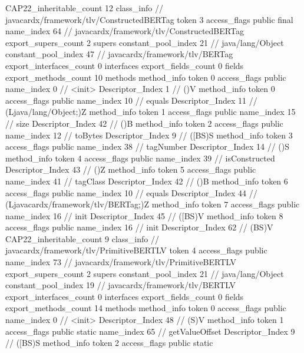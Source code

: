 {{{{{				}
			}
			CAP22_inheritable_count	12
		}
		class_info {		// javacardx/framework/tlv/ConstructedBERTag
			token	3
			access_flags	public final
			name_index	64		// javacardx/framework/tlv/ConstructedBERTag
			export_supers_count	2
			supers {
				constant_pool_index	21		// java/lang/Object
				constant_pool_index	47		// javacardx/framework/tlv/BERTag
			}
			export_interfaces_count	0
			interfaces {
			}
			export_fields_count	0
			fields {
			}
			export_methods_count	10
			methods {
				method_info {
					token	0
					access_flags	public
					name_index	0		// <init>
					Descriptor_Index	1		// ()V
				}
				method_info {
					token	0
					access_flags	public
					name_index	10		// equals
					Descriptor_Index	11		// (Ljava/lang/Object;)Z
				}
				method_info {
					token	1
					access_flags	public
					name_index	15		// size
					Descriptor_Index	42		// ()B
				}
				method_info {
					token	2
					access_flags	public
					name_index	12		// toBytes
					Descriptor_Index	9		// ([BS)S
				}
				method_info {
					token	3
					access_flags	public
					name_index	38		// tagNumber
					Descriptor_Index	14		// ()S
				}
				method_info {
					token	4
					access_flags	public
					name_index	39		// isConstructed
					Descriptor_Index	43		// ()Z
				}
				method_info {
					token	5
					access_flags	public
					name_index	41		// tagClass
					Descriptor_Index	42		// ()B
				}
				method_info {
					token	6
					access_flags	public
					name_index	10		// equals
					Descriptor_Index	44		// (Ljavacardx/framework/tlv/BERTag;)Z
				}
				method_info {
					token	7
					access_flags	public
					name_index	16		// init
					Descriptor_Index	45		// ([BS)V
				}
				method_info {
					token	8
					access_flags	public
					name_index	16		// init
					Descriptor_Index	62		// (BS)V
				}
			}
			CAP22_inheritable_count	9
		}
		class_info {		// javacardx/framework/tlv/PrimitiveBERTLV
			token	4
			access_flags	public
			name_index	73		// javacardx/framework/tlv/PrimitiveBERTLV
			export_supers_count	2
			supers {
				constant_pool_index	21		// java/lang/Object
				constant_pool_index	19		// javacardx/framework/tlv/BERTLV
			}
			export_interfaces_count	0
			interfaces {
			}
			export_fields_count	0
			fields {
			}
			export_methods_count	14
			methods {
				method_info {
					token	0
					access_flags	public
					name_index	0		// <init>
					Descriptor_Index	48		// (S)V
				}
				method_info {
					token	1
					access_flags	public static
					name_index	65		// getValueOffset
					Descriptor_Index	9		// ([BS)S
				}
				method_info {
					token	2
					access_flags	public static
}}}}}
